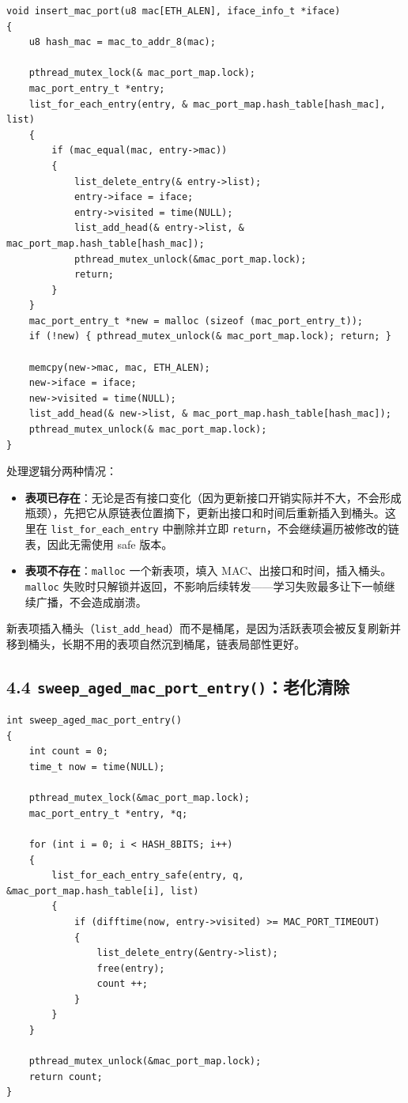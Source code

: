 \documentclass[UTF8,12pt,a4paper,fontset=fandol]{ctexart}
\begin{document}
\begin{verbatim}
void insert_mac_port(u8 mac[ETH_ALEN], iface_info_t *iface)
{
    u8 hash_mac = mac_to_addr_8(mac);

    pthread_mutex_lock(& mac_port_map.lock);
    mac_port_entry_t *entry;
    list_for_each_entry(entry, & mac_port_map.hash_table[hash_mac], list)
    {
        if (mac_equal(mac, entry->mac)) 
        {
            list_delete_entry(& entry->list);
            entry->iface = iface;
            entry->visited = time(NULL);
            list_add_head(& entry->list, & mac_port_map.hash_table[hash_mac]);
            pthread_mutex_unlock(&mac_port_map.lock);
            return;
        }
    }
    mac_port_entry_t *new = malloc (sizeof (mac_port_entry_t));
    if (!new) { pthread_mutex_unlock(& mac_port_map.lock); return; }

    memcpy(new->mac, mac, ETH_ALEN);
    new->iface = iface;
    new->visited = time(NULL);
    list_add_head(& new->list, & mac_port_map.hash_table[hash_mac]);
    pthread_mutex_unlock(& mac_port_map.lock);
}
\end{verbatim}

处理逻辑分两种情况：

\begin{itemize}[leftmargin=1.7em]
  \item \textbf{表项已存在}：无论是否有接口变化（因为更新接口开销实际并不大，不会形成瓶颈），先把它从原链表位置摘下，更新出接口和时间后重新插入到桶头。这里在 \texttt{list_for_each_entry} 中删除并立即 \texttt{return}，不会继续遍历被修改的链表，因此无需使用 safe 版本。
  \item \textbf{表项不存在}：\texttt{malloc} 一个新表项，填入 MAC、出接口和时间，插入桶头。\texttt{malloc} 失败时只解锁并返回，不影响后续转发——学习失败最多让下一帧继续广播，不会造成崩溃。
\end{itemize}

新表项插入桶头（\texttt{list_add_head}）而不是桶尾，是因为活跃表项会被反复刷新并移到桶头，长期不用的表项自然沉到桶尾，链表局部性更好。

\subsection*{4.4 \texttt{sweep_aged_mac_port_entry()}：老化清除}

\begin{verbatim}
int sweep_aged_mac_port_entry()
{
    int count = 0;
    time_t now = time(NULL);

    pthread_mutex_lock(&mac_port_map.lock);
    mac_port_entry_t *entry, *q;
    
    for (int i = 0; i < HASH_8BITS; i++) 
    {
        list_for_each_entry_safe(entry, q, &mac_port_map.hash_table[i], list) 
        {
            if (difftime(now, entry->visited) >= MAC_PORT_TIMEOUT)
            {
                list_delete_entry(&entry->list);
                free(entry);
                count ++;
            }
        }
    }

    pthread_mutex_unlock(&mac_port_map.lock);
    return count;
}
\end{verbatim}
\end{document}
